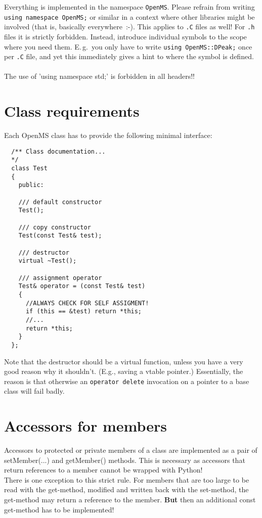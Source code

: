 \documentclass[a4]{article}
\begin{document}
Everything is implemented in the namespace \texttt{OpenMS}.  Please refrain
from writing \texttt{using namespace OpenMS;} or similar in a context where
other libraries might be involved (that is, basically everywhere~:-).  This
applies to \texttt{.C} files as well!  For \texttt{.h} files it is strictly
forbidden.  Instead, introduce individual symbols to the scope where you need
them.  E.\,g.\ you only have to write \texttt{using OpenMS::DPeak;} once per
\texttt{.C} file, and yet this immediately gives a hint to where the symbol is
defined.\\
\\
The use of 'using namespace std;' is forbidden in all headers!!


\section{Class requirements}

Each OpenMS class has to provide the following minimal interface:
\begin{verbatim}
  /** Class documentation... 
  */
  class Test
  {
    public:

    /// default constructor
    Test();

    /// copy constructor 
    Test(const Test& test);

    /// destructor 
    virtual ~Test();
 
    /// assignment operator
    Test& operator = (const Test& test)
    {
      //ALWAYS CHECK FOR SELF ASSIGMENT!
      if (this == &test) return *this;
      //...
      return *this;
    }
  };
\end{verbatim}
Note that the destructor should be a virtual function, unless you have a very
good reason why it shouldn't.  (E.g., saving a vtable pointer.)  Essentially,
the reason is that otherwise an \texttt{operator delete} invocation on a
pointer to a base class will fail badly.

\section{Accessors for members}
Accessors to protected or private members of a class are implemented as a pair
of setMember(...) and getMember() methods.
This is necessary as accessors that return references to a member cannot be wrapped with Python!\\
There is one exception to this strict rule. For members that are too large to be
read with the get-method, modified and written back with the set-method, the
get-method may return a reference to the member. {\bf But} then an additional const
get-method has to be implemented! 
\end{document}
